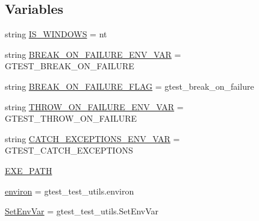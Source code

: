 \subsection*{Variables}
\begin{DoxyCompactItemize}
\item 
string \mbox{\hyperlink{namespacegoogletest_1_1test_1_1googletest-break-on-failure-unittest_a79d4cbe8ec7d7bca19a35d78436a5993}{I\+S\+\_\+\+W\+I\+N\+D\+O\+WS}} = \textquotesingle{}nt\textquotesingle{}
\item 
string \mbox{\hyperlink{namespacegoogletest_1_1test_1_1googletest-break-on-failure-unittest_a2ad49bd3190b904f9d4c6abbcbc7d6ba}{B\+R\+E\+A\+K\+\_\+\+O\+N\+\_\+\+F\+A\+I\+L\+U\+R\+E\+\_\+\+E\+N\+V\+\_\+\+V\+AR}} = \textquotesingle{}G\+T\+E\+S\+T\+\_\+\+B\+R\+E\+A\+K\+\_\+\+O\+N\+\_\+\+F\+A\+I\+L\+U\+RE\textquotesingle{}
\item 
string \mbox{\hyperlink{namespacegoogletest_1_1test_1_1googletest-break-on-failure-unittest_a8d5705c62837f9256c870037cd328b1d}{B\+R\+E\+A\+K\+\_\+\+O\+N\+\_\+\+F\+A\+I\+L\+U\+R\+E\+\_\+\+F\+L\+AG}} = \textquotesingle{}gtest\+\_\+break\+\_\+on\+\_\+failure\textquotesingle{}
\item 
string \mbox{\hyperlink{namespacegoogletest_1_1test_1_1googletest-break-on-failure-unittest_aeb4b3bcf84c7cf8e5d35041e0f057350}{T\+H\+R\+O\+W\+\_\+\+O\+N\+\_\+\+F\+A\+I\+L\+U\+R\+E\+\_\+\+E\+N\+V\+\_\+\+V\+AR}} = \textquotesingle{}G\+T\+E\+S\+T\+\_\+\+T\+H\+R\+O\+W\+\_\+\+O\+N\+\_\+\+F\+A\+I\+L\+U\+RE\textquotesingle{}
\item 
string \mbox{\hyperlink{namespacegoogletest_1_1test_1_1googletest-break-on-failure-unittest_a5024efcf3860e49f674f65f225184b66}{C\+A\+T\+C\+H\+\_\+\+E\+X\+C\+E\+P\+T\+I\+O\+N\+S\+\_\+\+E\+N\+V\+\_\+\+V\+AR}} = \textquotesingle{}G\+T\+E\+S\+T\+\_\+\+C\+A\+T\+C\+H\+\_\+\+E\+X\+C\+E\+P\+T\+I\+O\+NS\textquotesingle{}
\item 
\mbox{\hyperlink{namespacegoogletest_1_1test_1_1googletest-break-on-failure-unittest_a2f30a841589404516250336e48952e59}{E\+X\+E\+\_\+\+P\+A\+TH}}
\item 
\mbox{\hyperlink{namespacegoogletest_1_1test_1_1googletest-break-on-failure-unittest_a70e290c3024fb20151e901d98e819a77}{environ}} = gtest\+\_\+test\+\_\+utils.\+environ
\item 
\mbox{\hyperlink{namespacegoogletest_1_1test_1_1googletest-break-on-failure-unittest_a17f1e9976fa9cd12a20539297b844088}{Set\+Env\+Var}} = gtest\+\_\+test\+\_\+utils.\+Set\+Env\+Var
\end{DoxyCompactItemize}



